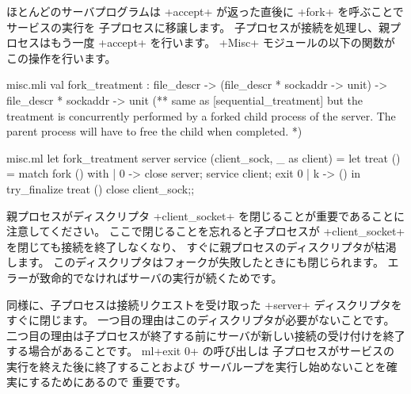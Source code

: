 ほとんどのサーバプログラムは \ml+accept+ が返った直後に \ml+fork+ を呼ぶことでサービスの実行を
子プロセスに移譲します。
子プロセスが接続を処理し、親プロセスはもう一度 \ml+accept+ を行います。
\ml+Misc+ モジュールの以下の関数がこの操作を行います。
%
\begin{codefile}{misc.mli}
val fork_treatment :
 file_descr -> (file_descr * sockaddr -> unit) ->
 file_descr * sockaddr -> unit
(** same as [sequential_treatment] but the treatment is concurrently
 performed by a forked child process of the server. The parent process
 will have to free the child when completed. *)
\end{codefile}
%
\begin{listingcodefile}{misc.ml}
let fork_treatment server service (client_sock, _ as client) =
  let treat () = match fork () with
    | 0 -> close server; service client; exit 0
    | k -> ()
  in
  try_finalize treat () close client_sock;;
\end{listingcodefile}
%
親プロセスがディスクリプタ \ml+client_socket+ を閉じることが重要であることに注意してください。
ここで閉じることを忘れると子プロセスが \ml+client_socket+ を閉じても接続を終了しなくなり、
すぐに親プロセスのディスクリプタが枯渇します。
このディスクリプタはフォークが失敗したときにも閉じられます。
エラーが致命的でなければサーバの実行が続くためです。

同様に、子プロセスは接続リクエストを受け取った \ml+server+ ディスクリプタをすぐに閉じます。
一つ目の理由はこのディスクリプタが必要がないことです。
二つ目の理由は子プロセスが終了する前にサーバが新しい接続の受け付けを終了する場合があることです。
ml+exit 0+ の呼び出しは
子プロセスがサービスの実行を終えた後に終了することおよび
サーバループを実行し始めないことを確実にするためにあるので
重要です。

